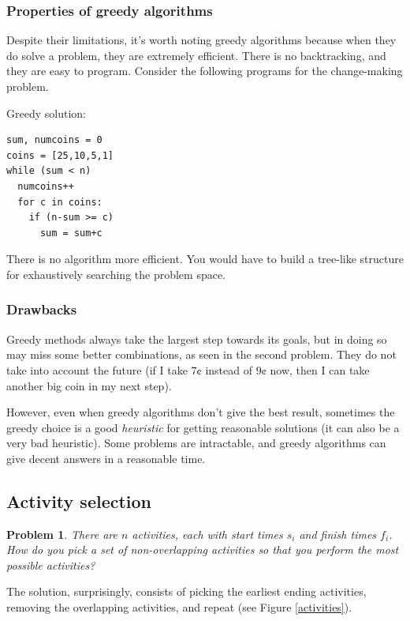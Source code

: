 \documentclass{article}
\newtheorem{problem}{Problem}
\begin{document}
\subsubsection{Properties of greedy algorithms}
Despite their limitations, it's worth noting greedy algorithms because when they do solve a problem, they are extremely efficient.  There is no backtracking, and they are easy to program.  Consider the following programs for the change-making problem.

Greedy solution:
\begin{verbatim}
sum, numcoins = 0
coins = [25,10,5,1]
while (sum < n)
  numcoins++
  for c in coins:
    if (n-sum >= c)
      sum = sum+c
\end{verbatim}

There is no algorithm more efficient.  You would have to build a tree-like structure for exhaustively searching the problem space.

\subsubsection{Drawbacks}
Greedy methods always take the largest step towards its goals, but in doing so may miss some better combinations, as seen in the second problem.  They do not take into account the future (if I take $7\cent$ instead of $9\cent$ now, then I can take another big coin in my next step).

However, even when greedy algorithms don't give the best result, sometimes the greedy choice is a good \textit{heuristic} for getting reasonable solutions (it can also be a very bad heuristic).  Some problems are intractable, and greedy algorithms can give decent answers in a reasonable time.

\subsection{Activity selection}
\begin{problem}
There are $n$ activities, each with start times $s_i$ and finish times $f_i$.  How do you pick a set of non-overlapping activities so that you perform the most possible activities?
\end{problem}

The solution, surprisingly, consists of picking the earliest ending activities, removing the overlapping activities, and repeat (see Figure \ref{activities}).
\end{document}
